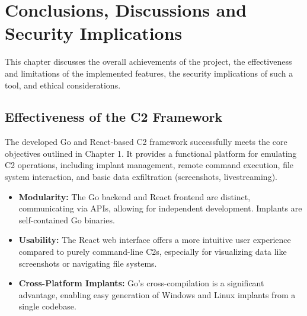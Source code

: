 \chapter{Conclusions, Discussions and Security Implications}
\label{chap:discussion}

This chapter discusses the overall achievements of the project, the effectiveness and limitations of the implemented features, the security implications of such a tool, and ethical considerations.

\section{Effectiveness of the C2 Framework}
The developed Go and React-based C2 framework successfully meets the core objectives outlined in Chapter 1. It provides a functional platform for emulating C2 operations, including implant management, remote command execution, file system interaction, and basic data exfiltration (screenshots, livestreaming).
\begin{itemize}
    \item \textbf{Modularity:} The Go backend and React frontend are distinct, communicating via APIs, allowing for independent development. Implants are self-contained Go binaries.
    \item \textbf{Usability:} The React web interface offers a more intuitive user experience compared to purely command-line C2s, especially for visualizing data like screenshots or navigating file systems.
    \item \textbf{Cross-Platform Implants:} Go's cross-compilation is a significant advantage, enabling easy generation of Windows and Linux implants from a single codebase.
\end{itemize}

